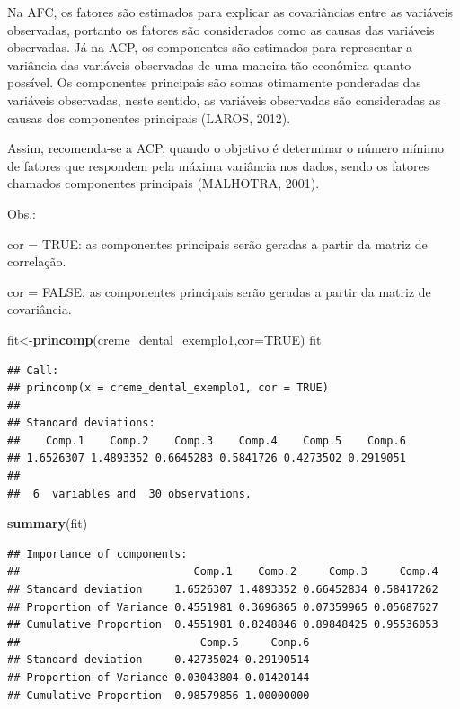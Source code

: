 \documentclass[12pt,brazil,]{book}
\newenvironment{Shaded}{\begin{snugshade}}{\end{snugshade}}
\newcommand{\DataTypeTok}[1]{\textcolor[rgb]{0.13,0.29,0.53}{#1}}
\newcommand{\KeywordTok}[1]{\textcolor[rgb]{0.13,0.29,0.53}{\textbf{#1}}}
\newcommand{\NormalTok}[1]{#1}
\newcommand{\OtherTok}[1]{\textcolor[rgb]{0.56,0.35,0.01}{#1}}
\begin{document}
Na AFC, os fatores são estimados para explicar as covariâncias entre as
variáveis observadas, portanto os fatores são considerados como as
causas das variáveis observadas. Já na ACP, os componentes são estimados
para representar a variância das variáveis observadas de uma maneira tão
econômica quanto possível. Os componentes principais são somas
otimamente ponderadas das variáveis observadas, neste sentido, as
variáveis observadas são consideradas as causas dos componentes
principais (LAROS, 2012).

Assim, recomenda-se a ACP, quando o objetivo é determinar o número
mínimo de fatores que respondem pela máxima variância nos dados, sendo
os fatores chamados componentes principais (MALHOTRA, 2001).

Obs.:

cor = TRUE: as componentes principais serão geradas a partir da matriz
de correlação.

cor = FALSE: as componentes principais serão geradas a partir da matriz
de covariância.

\begin{Shaded}
\begin{Highlighting}[]
\NormalTok{fit<-}\KeywordTok{princomp}\NormalTok{(creme_dental_exemplo1,}\DataTypeTok{cor=}\OtherTok{TRUE}\NormalTok{)}
\NormalTok{fit}
\end{Highlighting}
\end{Shaded}

\begin{verbatim}
## Call:
## princomp(x = creme_dental_exemplo1, cor = TRUE)
## 
## Standard deviations:
##    Comp.1    Comp.2    Comp.3    Comp.4    Comp.5    Comp.6 
## 1.6526307 1.4893352 0.6645283 0.5841726 0.4273502 0.2919051 
## 
##  6  variables and  30 observations.
\end{verbatim}

\begin{Shaded}
\begin{Highlighting}[]
\KeywordTok{summary}\NormalTok{(fit)}
\end{Highlighting}
\end{Shaded}

\begin{verbatim}
## Importance of components:
##                           Comp.1    Comp.2     Comp.3     Comp.4
## Standard deviation     1.6526307 1.4893352 0.66452834 0.58417262
## Proportion of Variance 0.4551981 0.3696865 0.07359965 0.05687627
## Cumulative Proportion  0.4551981 0.8248846 0.89848425 0.95536053
##                            Comp.5     Comp.6
## Standard deviation     0.42735024 0.29190514
## Proportion of Variance 0.03043804 0.01420144
## Cumulative Proportion  0.98579856 1.00000000
\end{verbatim}
\end{document}
